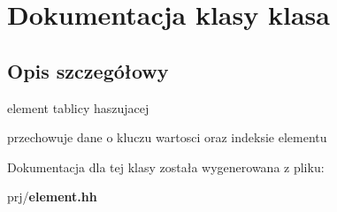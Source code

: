 \section{\-Dokumentacja klasy klasa}
\label{classklasa}


\subsection{\-Opis szczegółowy}
element tablicy haszujacej

przechowuje dane o kluczu wartosci oraz indeksie elementu 

\-Dokumentacja dla tej klasy została wygenerowana z pliku\-:\begin{DoxyCompactItemize}
\item 
prj/{\bf element.\-hh}\end{DoxyCompactItemize}
